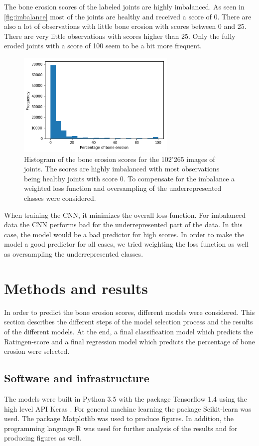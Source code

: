 \documentclass[12pt]{article}
\begin{document}
The bone erosion scores of the labeled joints are highly imbalanced. As seen in \autoref{fig:imbalance} most of the joints are healthy and received a score of 0. There are also a lot of observations with little bone erosion with scores between 0 and 25. There are very little observations with scores higher than 25. Only the fully eroded joints with a score of 100 seem to be a bit more frequent.

\begin{figure}[ht]
\includegraphics[width=3in]{imbalance}	
\caption{Histogram of the bone erosion scores for the 102'265 images of joints. The scores are highly imbalanced with most observations being healthy joints with score 0. To compensate for the imbalance a weighted loss function and oversampling of the underrepresented classes were considered.}
\label{fig:imbalance}
\end{figure}

When training the CNN, it minimizes the overall loss-function. For imbalanced data the CNN performs bad for the underrepresented part of the data. In this case, the model would be a bad predictor for high scores. In order to make the model a good predictor for all cases, we tried weighting the loss function as well as oversampling the underrepresented classes.

\newpage
\section{Methods and results}
\label{sec:methods&results}

In order to predict the bone erosion scores, different models were considered. This section describes the different steps of the model selection process and the results of the different models. At the end, a final classification model which predicts the Ratingen-score and a final regression model which predicts the percentage of bone erosion were selected.

\subsection{Software and infrastructure}
The models were built in Python 3.5 \cite{python} with the package Tensorflow 1.4 \cite{tensorflow} using the high level API Keras \cite{keras}. For general machine learning the package Scikit-learn \cite{scikit-learn} was used. The package Matplotlib \cite{matplotlib} was used to produce figures. In addition, the programming language R \cite{r} was used for further analysis of the results and for producing figures as well.
\end{document}
